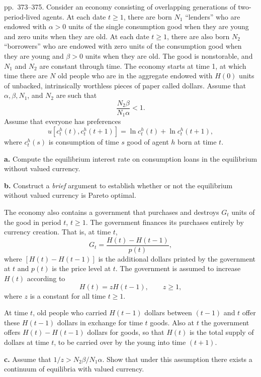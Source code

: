\documentclass[12pt, letterpaper]{article}
\begin{document}
\begin{tcolorbox}[evenbox,title={Exercise 9.10 \quad Seignorage}]
\begin{tcolorbox}[questionbox]
pp.~373--375. Consider an economy consisting of overlapping generations of two-period-lived agents.
At each date $t\ge1$, there are born $N_1$ ``lenders'' who are endowed with $\alpha>0$ units of the
single consumption good when they are young and zero units when they are old. At each date $t\ge1$,
there are also born $N_2$ ``borrowers'' who are endowed with zero units of the consumption good when
they are young and $\beta>0$ units when they are old. The good is nonstorable, and $N_1$ and $N_2$ are
constant through time. The economy starts at time 1, at which time there are $N$ old people who are
in the aggregate endowed with $H(0)$ units of unbacked, intrinsically worthless pieces of paper called
dollars. Assume that $\alpha,\beta,N_1$, and $N_2$ are such that
\[
\frac{N_2\beta}{N_1\alpha}<1.
\]
Assume that everyone has preferences
\[
u[c_t^h(t),c_t^h(t+1)]=\ln c_t^h(t)+\ln c_t^h(t+1),
\]
where $c_t^h(s)$ is consumption of time $s$ good of agent $h$ born at time $t$.

\textbf{a.} Compute the equilibrium interest rate on consumption loans in the equilibrium without
valued currency.

\textbf{b.} Construct a \emph{brief} argument to establish whether or not the equilibrium without
valued currency is Pareto optimal.

The economy also contains a government that purchases and destroys $G_t$ units of the good in period
$t$, $t\ge1$. The government finances its purchases entirely by currency creation. That is, at time
$t$,
\[
G_t=\frac{H(t)-H(t-1)}{p(t)},
\]
where $[H(t)-H(t-1)]$ is the additional dollars printed by the government at $t$ and $p(t)$ is the
price level at $t$. The government is assumed to increase $H(t)$ according to
\[
H(t)=zH(t-1),\qquad z\ge1,
\]
where $z$ is a constant for all time $t\ge1$.

At time $t$, old people who carried $H(t-1)$ dollars between $(t-1)$ and $t$ offer these $H(t-1)$
dollars in exchange for time $t$ goods. Also at $t$ the government offers $H(t)-H(t-1)$ dollars for
goods, so that $H(t)$ is the total supply of dollars at time $t$, to be carried over by the young into
time $(t+1)$.

\textbf{c.} Assume that $1/z>N_2\beta/N_1\alpha$. Show that under this assumption there exists a
continuum of equilibria with valued currency.


\end{tcolorbox}
\end{tcolorbox}
\end{document}
